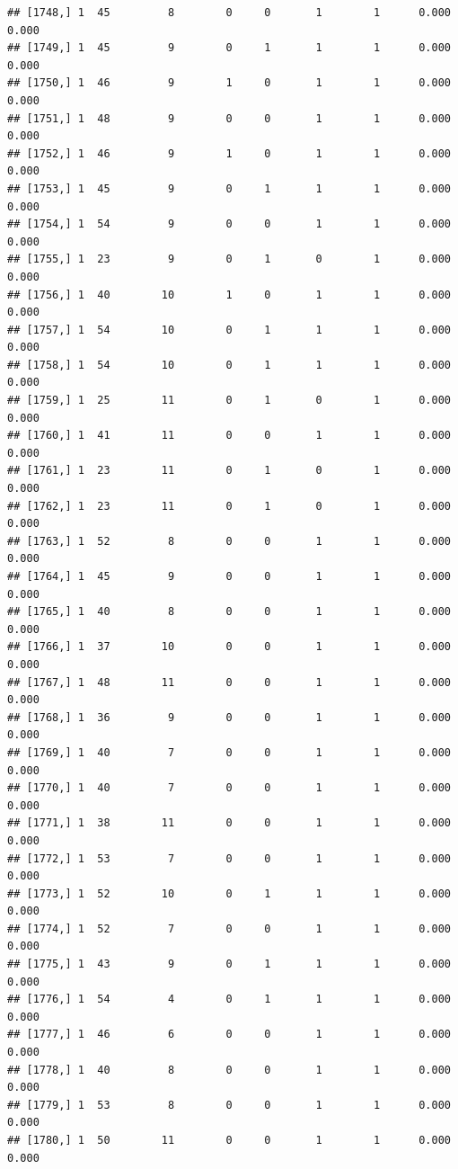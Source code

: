\documentclass[
]{article}
\begin{document}
\begin{verbatim}
## [1748,] 1  45         8        0     0       1        1      0.000      0.000
## [1749,] 1  45         9        0     1       1        1      0.000      0.000
## [1750,] 1  46         9        1     0       1        1      0.000      0.000
## [1751,] 1  48         9        0     0       1        1      0.000      0.000
## [1752,] 1  46         9        1     0       1        1      0.000      0.000
## [1753,] 1  45         9        0     1       1        1      0.000      0.000
## [1754,] 1  54         9        0     0       1        1      0.000      0.000
## [1755,] 1  23         9        0     1       0        1      0.000      0.000
## [1756,] 1  40        10        1     0       1        1      0.000      0.000
## [1757,] 1  54        10        0     1       1        1      0.000      0.000
## [1758,] 1  54        10        0     1       1        1      0.000      0.000
## [1759,] 1  25        11        0     1       0        1      0.000      0.000
## [1760,] 1  41        11        0     0       1        1      0.000      0.000
## [1761,] 1  23        11        0     1       0        1      0.000      0.000
## [1762,] 1  23        11        0     1       0        1      0.000      0.000
## [1763,] 1  52         8        0     0       1        1      0.000      0.000
## [1764,] 1  45         9        0     0       1        1      0.000      0.000
## [1765,] 1  40         8        0     0       1        1      0.000      0.000
## [1766,] 1  37        10        0     0       1        1      0.000      0.000
## [1767,] 1  48        11        0     0       1        1      0.000      0.000
## [1768,] 1  36         9        0     0       1        1      0.000      0.000
## [1769,] 1  40         7        0     0       1        1      0.000      0.000
## [1770,] 1  40         7        0     0       1        1      0.000      0.000
## [1771,] 1  38        11        0     0       1        1      0.000      0.000
## [1772,] 1  53         7        0     0       1        1      0.000      0.000
## [1773,] 1  52        10        0     1       1        1      0.000      0.000
## [1774,] 1  52         7        0     0       1        1      0.000      0.000
## [1775,] 1  43         9        0     1       1        1      0.000      0.000
## [1776,] 1  54         4        0     1       1        1      0.000      0.000
## [1777,] 1  46         6        0     0       1        1      0.000      0.000
## [1778,] 1  40         8        0     0       1        1      0.000      0.000
## [1779,] 1  53         8        0     0       1        1      0.000      0.000
## [1780,] 1  50        11        0     0       1        1      0.000      0.000

\end{verbatim}
\end{document}
